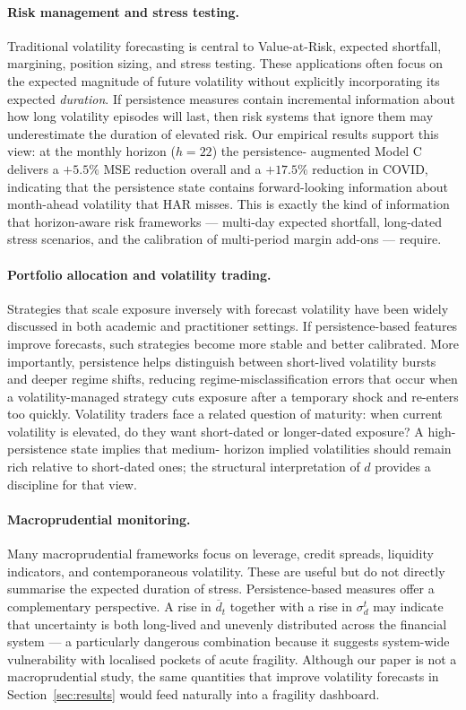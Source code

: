 \documentclass[11pt,a4paper]{article}
\newcommand{\dhat}{\hat d}
\begin{document}
\paragraph{Risk management and stress testing.}
Traditional volatility forecasting is central to Value-at-Risk, expected
shortfall, margining, position sizing, and stress testing. These
applications often focus on the expected magnitude of future volatility
without explicitly incorporating its expected \emph{duration}. If
persistence measures contain incremental information about how long
volatility episodes will last, then risk systems that ignore them may
underestimate the duration of elevated risk. Our empirical results
support this view: at the monthly horizon ($h=22$) the persistence-
augmented Model C delivers a $+5.5\%$ MSE reduction overall and a
$+17.5\%$ reduction in COVID, indicating that the persistence state
contains forward-looking information about month-ahead volatility that
HAR misses. This is exactly the kind of information that horizon-aware
risk frameworks --- multi-day expected shortfall, long-dated stress
scenarios, and the calibration of multi-period margin add-ons ---
require.

\paragraph{Portfolio allocation and volatility trading.}
Strategies that scale exposure inversely with forecast volatility have
been widely discussed in both academic and practitioner settings. If
persistence-based features improve forecasts, such strategies become
more stable and better calibrated. More importantly, persistence helps
distinguish between short-lived volatility bursts and deeper regime
shifts, reducing regime-misclassification errors that occur when a
volatility-managed strategy cuts exposure after a temporary shock and
re-enters too quickly. Volatility traders face a related question of
maturity: when current volatility is elevated, do they want short-dated
or longer-dated exposure? A high-persistence state implies that medium-
horizon implied volatilities should remain rich relative to short-dated
ones; the structural interpretation of $\dhat$ provides a discipline
for that view.

\paragraph{Macroprudential monitoring.}
Many macroprudential frameworks focus on leverage, credit spreads,
liquidity indicators, and contemporaneous volatility. These are useful
but do not directly summarise the expected duration of stress.
Persistence-based measures offer a complementary perspective. A rise in
$\overline d_t$ together with a rise in $\sigma_d^t$ may indicate that
uncertainty is both long-lived and unevenly distributed across the
financial system --- a particularly dangerous combination because it
suggests system-wide vulnerability with localised pockets of acute
fragility. Although our paper is not a macroprudential study, the same
quantities that improve volatility forecasts in
Section~\ref{sec:results} would feed naturally into a fragility
dashboard.
\end{document}
